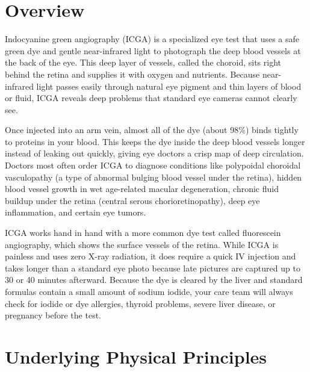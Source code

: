 \label{ch:infographic-icga}

\section{Overview}

Indocyanine green angiography (ICGA) is a specialized eye test that uses a safe green dye and gentle near-infrared light to photograph the deep blood vessels at the back of the eye. This deep layer of vessels, called the choroid, sits right behind the retina and supplies it with oxygen and nutrients. Because near-infrared light passes easily through natural eye pigment and thin layers of blood or fluid, ICGA reveals deep problems that standard eye cameras cannot clearly see.

Once injected into an arm vein, almost all of the dye (about 98\%) binds tightly to proteins in your blood. This keeps the dye inside the deep blood vessels longer instead of leaking out quickly, giving eye doctors a crisp map of deep circulation. Doctors most often order ICGA to diagnose conditions like polypoidal choroidal vasculopathy (a type of abnormal bulging blood vessel under the retina), hidden blood vessel growth in wet age-related macular degeneration, chronic fluid buildup under the retina (central serous chorioretinopathy), deep eye inflammation, and certain eye tumors.

ICGA works hand in hand with a more common dye test called fluorescein angiography, which shows the surface vessels of the retina. While ICGA is painless and uses zero X-ray radiation, it does require a quick IV injection and takes longer than a standard eye photo because late pictures are captured up to 30 or 40 minutes afterward. Because the dye is cleared by the liver and standard formulas contain a small amount of sodium iodide, your care team will always check for iodide or dye allergies, thyroid problems, severe liver disease, or pregnancy before the test.

\section{Underlying Physical Principles}


